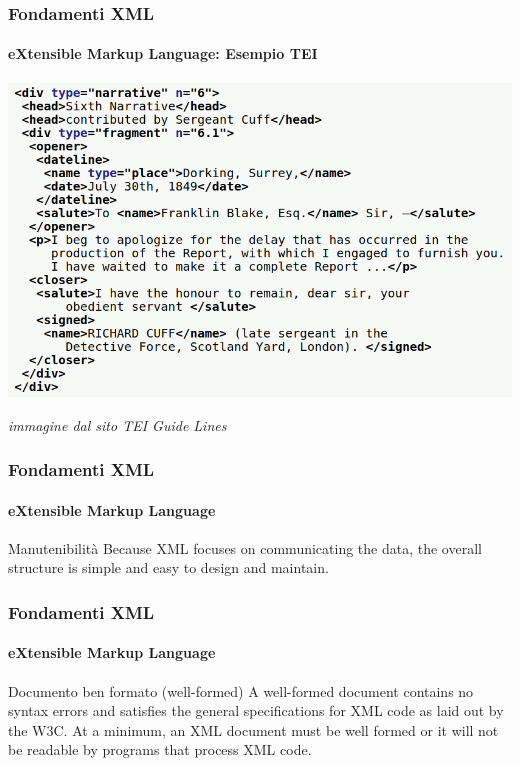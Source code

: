 \begin{frame}
	\frametitle{Fondamenti XML}
	\framesubtitle{eXtensible Markup Language: Esempio TEI}
	\addtocounter{nframe}{1}

	\begin{center}
		\includegraphics[width=.9\textwidth]{imgs/TEI-Example.png}
	\end{center}

	\begin{tiny}
        \textit{immagine dal sito TEI Guide Lines}
    \end{tiny}

\end{frame}

\begin{frame}
	\frametitle{Fondamenti XML}
	\framesubtitle{eXtensible Markup Language}
	\addtocounter{nframe}{1}

	\begin{block}{Manutenibilità}
		Because XML focuses on communicating the data, the overall structure is simple and easy to design and
maintain.
	\end{block}

\end{frame}

\begin{frame}
	\frametitle{Fondamenti XML}
	\framesubtitle{eXtensible Markup Language}
	\addtocounter{nframe}{1}

	\begin{block}{Documento ben formato (well-formed)}
        A well-formed document contains no syntax errors and satisfies the general specifications for XML code as laid
        out by the W3C. At a minimum, an XML document must be well formed or it will not
        be readable by programs that process XML code.
	\end{block}

\end{frame}


